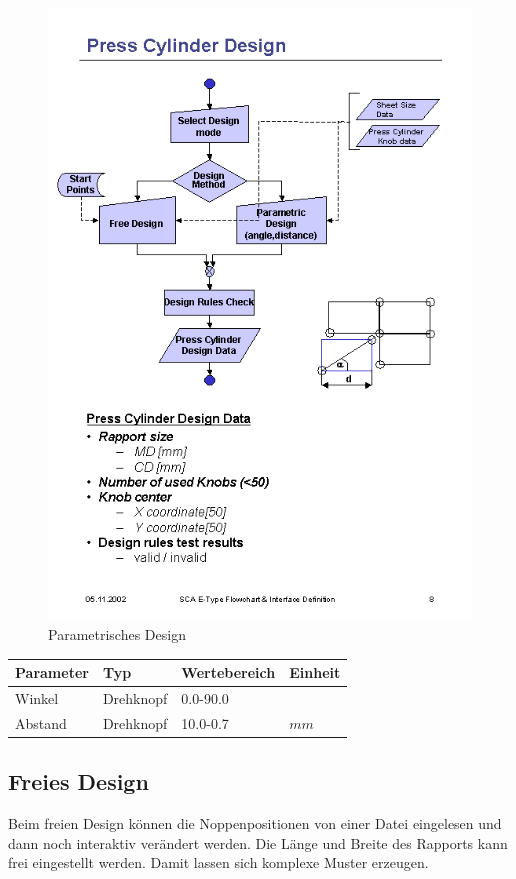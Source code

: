 \begin{figure}[!Hhtp]
  \begin{center}
   \includegraphics[scale=0.7]{process/pdesign}
   \caption{Parametrisches Design}
  \end{center}
\end{figure}

\begin{tabular}{|l|l|l|l|} \hline
Parameter 		& Typ 		& Wertebereich 	& Einheit		\\ \hline
Winkel			& Drehknopf	& 0.0-90.0 		& \symbol{23}	\\ \hline
Abstand 		& Drehknopf	& 10.0-0.7 		& $mm$ 			\\ \hline
\end{tabular}


\subsection{Freies Design}
Beim freien Design k\"onnen die Noppenpositionen von einer Datei eingelesen 
und dann noch interaktiv ver\"andert werden. Die L\"ange und Breite des Rapports
kann frei eingestellt werden. Damit lassen sich komplexe Muster erzeugen.

